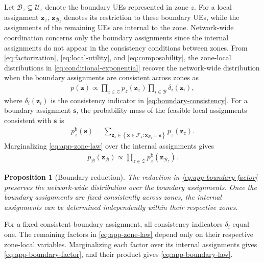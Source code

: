 \documentclass[journal]{IEEEtran}
\newtheorem{proposition}{Proposition}
\begin{document}
{Let $\mathcal B_z\subseteq\mathcal U_z$ denote the boundary UEs represented in zone $z$. For a local assignment $\bm z_z$, $\bm z_{\mathcal B_z}$ denotes its restriction to these boundary UEs, while the assignments of the remaining UEs are internal to the zone. Network-wide coordination concerns only the boundary assignments since the internal assignments do not appear in the consistency conditions between zones.
From \eqref{eq:factorization}, \eqref{eq:local-utility}, and \eqref{eq:composability}, the zone-local distributions in
\eqref{eq:conditional-exponential} recover the network-wide distribution when the boundary assignments are consistent across zones as
\begin{align}
p(\bm z)
\propto
\prod_{z\in\mathcal Z}p_z(\bm z_z)
\prod_{i\in\mathcal B}\delta_i(\bm z_i),
\label{eq:app-zone-law}
\end{align}
where $\delta_i(\bm z_i)$ is the consistency indicator in \eqref{eq:boundary-consistency}. For a boundary assignment $\bm s$,
the probability mass of the feasible local assignments consistent with $\bm s$ is
\begin{align}
p_z^{\mathrm b}(\bm s)=\sum_{\bm z_z\in\left\{\bm x\in\mathcal F_z:\bm x_{\mathcal B_z}=\bm s\right\}}p_z(\bm z_z).
\label{eq:app-boundary-factor}
\end{align}
Marginalizing \eqref{eq:app-zone-law} over the internal assignments gives
\begin{align}
p_{\mathcal B}(\bm z_{\mathcal B})\propto\prod_{z\in\mathcal Z}p_z^{\mathrm b}\!\left(\bm z_{\mathcal B_z}\right).
\label{eq:app-boundary-law}
\end{align}

\begin{proposition}[Boundary reduction]
\label{prop:app-boundary}
The reduction in \eqref{eq:app-boundary-factor} preserves the
network-wide distribution over the boundary assignments. Once the
boundary assignments are fixed consistently across zones, the internal
assignments can be determined independently within their respective
zones.
\end{proposition}

\begin{IEEEproof}
For a fixed consistent boundary assignment, all consistency indicators
$\delta_i$ equal one. The remaining factors in
\eqref{eq:app-zone-law} depend only on their respective zone-local
variables. Marginalizing each factor over its internal assignments
gives \eqref{eq:app-boundary-factor}, and their product gives
\eqref{eq:app-boundary-law}.
\end{IEEEproof}

}
\end{document}
